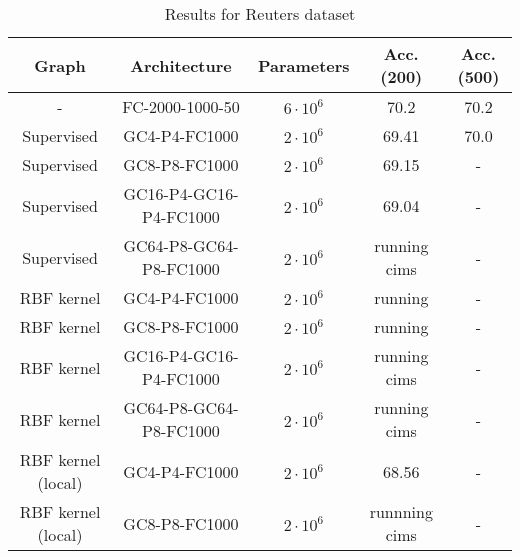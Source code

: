 \begin{table}[H]
\caption{Results for Reuters dataset}
\begin{center}
\begin{tabular}{|c|c|c|c|c|}
\hline
Graph & Architecture & Parameters & Acc. (200) & Acc. (500)\\
\hline
- &FC-2000-1000-50 & $6 \cdot 10^6$ & 70.2 & 70.2 \\
Supervised & GC4-P4-FC1000 & $2\cdot 10^6$ & 69.41 & 70.0 \\
Supervised & GC8-P8-FC1000 & $2 \cdot 10^6$ & 69.15 & - \\
Supervised & GC16-P4-GC16-P4-FC1000& $2 \cdot 10^6$ & 69.04 & - \\
Supervised &GC64-P8-GC64-P8-FC1000 & $2 \cdot 10^6$ & running cims & - \\
RBF kernel & GC4-P4-FC1000 & $2\cdot 10^6$ & running & - \\
RBF kernel & GC8-P8-FC1000 & $2 \cdot 10^6$ & running & - \\
RBF kernel & GC16-P4-GC16-P4-FC1000 & $2 \cdot 10^6$ & running cims & - \\
RBF kernel & GC64-P8-GC64-P8-FC1000 & $2 \cdot 10^6$ & running cims & - \\
RBF kernel (local)& GC4-P4-FC1000 & $2\cdot 10^6$ & 68.56 & - \\
RBF kernel (local) & GC8-P8-FC1000 & $2 \cdot 10^6$ & runnning cims & - \\
\hline
\end{tabular}
\end{center}
\end{table}


